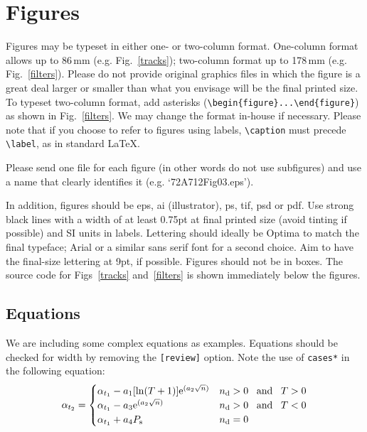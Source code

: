 \documentclass[aog]{igs}
\begin{document}
\section{Figures}

Figures may be typeset in either one- or two-column format. One-column format allows up to 86$\,$mm (e.g. Fig.~\ref{tracks}); two-column format up to 178$\,$mm (e.g. Fig.~\ref{filters}). Please do not provide original graphics files in which the figure is a great deal larger or smaller than what you envisage will be the final printed size. To typeset two-column format, add asterisks (\verb"\begin{figure}...\end{figure}") as shown in Fig.~\ref{filters}. We may change the format in-house if necessary. Please note that if you choose to refer to figures using labels, \verb"\caption" must precede \verb"\label", as in standard \LaTeX. 

Please send one file for each figure (in other words do not use subfigures) and use a name that clearly identifies it (e.g. `72A712Fig03.eps').

In addition, figures should be eps, ai (illustrator), ps, tif, psd or pdf. Use strong black lines with a width of at least 0.75pt at final printed size (avoid tinting if possible) and SI units in labels. Lettering should ideally be Optima to match the final typeface; Arial or a similar sans serif font for a second choice. Aim to have the final-size lettering at 9pt, if possible. Figures should not be in boxes. The source code for Figs~\ref{tracks} and~\ref{filters} is shown immediately below the figures.


\subsection{Equations}

We are including some complex equations as examples. Equations should be checked for width by removing the \verb"[review]" option. Note the use of \verb|cases*| in the following equation:
\begin{equation}
\label{arrayexample}
\alpha_{t_2}= %
  \begin{cases}
    \alpha_{t_1} - a_1 [\ln (T+1)]
      \mathrm{e}^{(a_2\sqrt{n})}
      & \mbox{$n_\mathrm{d} > 0\enskip$ and
      $\enskip T > 0$}\\
    \alpha_{t_1} - a_3 \mathrm{e}^{(a_2\sqrt{n})}
      & \mbox{$n_\mathrm{d} > 0\enskip$ and
      $\enskip T < 0$}\\
    \alpha_{t_1} + a_4 P_\mathrm{s}
      & \mbox{$n_\mathrm{d} = 0$}
  \end{cases}
\end{equation}
\end{document}
